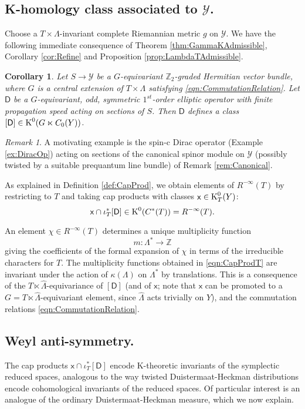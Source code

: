 \documentclass[11pt,reqno]{amsart}
\newtheorem{corollary}[theorem]{Corollary}
\theoremstyle{definition}
\theoremstyle{remark}
\newtheorem{remark}[theorem]{Remark}
\newcommand{\wh}[1]{\widehat{#1}}
\newcommand{\st}[1]{\mathsf{#1}}
\def\Y{\ensuremath{\mathcal{Y}}}
\def\K{\ensuremath{\mathcal{K}}}
\def\bZ{\ensuremath{\mathbb{Z}}}
\def\K{\ensuremath{\textnormal{K}}}
\def\hLambda{\ensuremath{\widehat{\Lambda}}}
\begin{document}
\subsection{K-homology class associated to $\Y$.}\label{sec:KHomGlobTrans}
Choose a $T\times \Lambda$-invariant complete Riemannian metric $g$ on $\Y$.  We have the following immediate consequence of Theorem \ref{thm:GammaKAdmissible}, Corollary \ref{cor:Refine} and Proposition \ref{prop:LambdaTAdmissible}.
\begin{corollary}
\label{cor:KHomologyTrans}
Let $S \rightarrow \Y$ be a $G$-equivariant $\bZ_2$-graded Hermitian vector bundle, where $G$ is a central extension of $T \times \Lambda$ satisfying \eqref{eqn:CommutationRelation}.  Let $\st{D}$ be a $G$-equivariant, odd, symmetric $1^{st}$-order elliptic operator with finite propagation speed acting on sections of $S$.  Then $\st{D}$ defines a class $[\st{D}] \in \K^0(G \ltimes C_0(Y))$.
\end{corollary}
\begin{remark}
A motivating example is the spin-c Dirac operator (Example \ref{ex:DiracOp}) acting on sections of the canonical spinor module on $\Y$ (possibly twisted by a suitable prequantum line bundle) of Remark \ref{rem:Canonical}.
\end{remark}
As explained in Definition \ref{def:CapProd}, we obtain elements of $R^{-\infty}(T)$ by restricting to $T$ and taking cap products with classes $\st{x} \in \K^0_T(Y)$:
\begin{equation} 
\label{eqn:CapProdT}
\st{x} \cap \iota_T^\ast[\st{D}] \in \K^0(C^\ast(T))=R^{-\infty}(T).
\end{equation}

An element $\chi \in R^{-\infty}(T)$ determines a unique multiplicity function
\[ m \colon \Lambda^\ast \rightarrow \bZ \]
giving the coefficients of the formal expansion of $\chi$ in terms of the irreducible characters for $T$.  The multiplicity functions obtained in \eqref{eqn:CapProdT} are invariant under the action of $\kappa(\Lambda)$ on $\Lambda^\ast$ by translations.  This is a consequence of the $T \ltimes \hLambda$-equivariance of $[\st{D}]$ (and of $\st{x}$; note that $\st{x}$ can be promoted to a $G=T\ltimes \wh{\Lambda}$-equivariant element, since $\wh{\Lambda}$ acts trivially on $Y$), and the commutation relations \eqref{eqn:CommutationRelation}.

\subsection{Weyl anti-symmetry.}\label{sec:WeylAnti}
The cap products $\st{x} \cap \iota_T^\ast [\st{D}]$ encode K-theoretic invariants of the symplectic reduced spaces, analogous to the way twisted Duistermaat-Heckman distributions encode cohomological invariants of the reduced spaces.  Of particular interest is an analogue of the ordinary Duistermaat-Heckman measure, which we now explain.  
\end{document}
